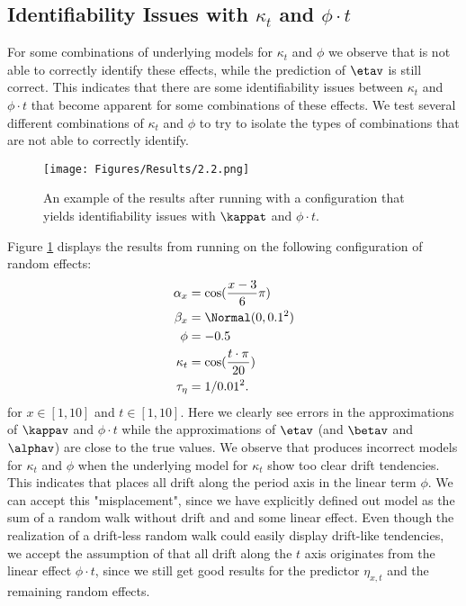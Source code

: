 \subsection{Identifiability Issues with $\kappa_t$ and $\phi\cdot t$}
\label{sec:IdentifiabilityKappa}
For some combinations of underlying models for $\kappa_t$ and $\phi$ we observe that \inlabru is not able to correctly identify these effects, while the prediction of $\etav$ is still correct. This indicates that there are some identifiability issues between $\kappa_t$ and $\phi \cdot t$ that become apparent for some combinations of these effects. We test several different combinations of $\kappa_t$ and $\phi$ to try to isolate the types of combinations that \inlabru are not able to correctly identify.
\begin{figure}[h!]
    \centering
    \texttt{[image: Figures/Results/2.2.png]}
    \caption{An example of the results after running \inlabru with a configuration that yields identifiability issues with $\kappat$ and $\phi \cdot t$. }
    \label{fig:unidentifiabilityKappa}
\end{figure}
Figure \ref{fig:unidentifiabilityKappa} displays the results from running \inlabru on the following configuration of random effects:
\begin{equation}
    \begin{aligned}
    \alpha_x &= \cos(\frac{x-3}{6}\pi)\\
    \beta_x &= \Normal(0,0.1^2)\\
    \phi &= -0.5\\
    \kappa_t &= \cos(\frac{t\cdot \pi}{20})\\
    \tau_{\eta} &= 1/0.01^2.
    \end{aligned}
\end{equation}
for $x\in[1,10]$ and $t\in[1,10]$. Here we clearly see errors in the approximations of $\kappav$ and $\phi\cdot t$ while the approximations of $\etav$ (and $\betav$ and $\alphav$) are close to the true values. We observe that \inlabru produces incorrect models for $\kappa_t$ and $\phi$ when the underlying model for $\kappa_t$ show too clear drift tendencies. This indicates that \inlabru places all drift along the period axis in the linear term $\phi$. We can accept this "misplacement", since we have explicitly defined out model as the sum of a random walk without drift and and some linear effect. Even though the realization of a drift-less random walk could easily display drift-like tendencies, we accept the assumption of \inlabru that all drift along the $t$ axis originates from the linear effect $\phi \cdot t$, since we still get good results for the predictor $\eta_{x,t}$ and the remaining random effects.

